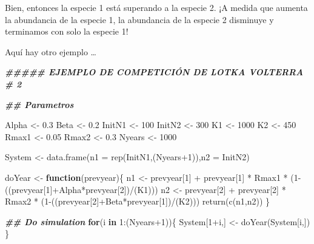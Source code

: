 \documentclass[
]{article}
\newenvironment{Shaded}{\begin{snugshade}}{\end{snugshade}}
\newcommand{\AttributeTok}[1]{\textcolor[rgb]{0.77,0.63,0.00}{#1}}
\newcommand{\ControlFlowTok}[1]{\textcolor[rgb]{0.13,0.29,0.53}{\textbf{#1}}}
\newcommand{\DecValTok}[1]{\textcolor[rgb]{0.00,0.00,0.81}{#1}}
\newcommand{\DocumentationTok}[1]{\textcolor[rgb]{0.56,0.35,0.01}{\textbf{\textit{#1}}}}
\newcommand{\FloatTok}[1]{\textcolor[rgb]{0.00,0.00,0.81}{#1}}
\newcommand{\FunctionTok}[1]{\textcolor[rgb]{0.00,0.00,0.00}{#1}}
\newcommand{\NormalTok}[1]{#1}
\newcommand{\OtherTok}[1]{\textcolor[rgb]{0.56,0.35,0.01}{#1}}
\newcommand{\SpecialCharTok}[1]{\textcolor[rgb]{0.00,0.00,0.00}{#1}}
\begin{document}
Bien, entonces la especie 1 está superando a la especie 2. ¡A medida que
aumenta la abundancia de la especie 1, la abundancia de la especie 2
disminuye y terminamos con solo la especie 1!

Aquí hay otro ejemplo \ldots{}

\begin{Shaded}
\begin{Highlighting}[]
\DocumentationTok{\#\#\#\#\# EJEMPLO DE COMPETICIÓN DE LOTKA VOLTERRA \# 2}

\DocumentationTok{\#\# Parametros}

\NormalTok{Alpha }\OtherTok{\textless{}{-}} \FloatTok{0.3}
\NormalTok{Beta }\OtherTok{\textless{}{-}} \FloatTok{0.2}
\NormalTok{InitN1 }\OtherTok{\textless{}{-}} \DecValTok{100}
\NormalTok{InitN2 }\OtherTok{\textless{}{-}} \DecValTok{300}
\NormalTok{K1 }\OtherTok{\textless{}{-}} \DecValTok{1000}
\NormalTok{K2 }\OtherTok{\textless{}{-}} \DecValTok{450}
\NormalTok{Rmax1 }\OtherTok{\textless{}{-}} \FloatTok{0.05}
\NormalTok{Rmax2 }\OtherTok{\textless{}{-}} \FloatTok{0.3}
\NormalTok{Nyears }\OtherTok{\textless{}{-}} \DecValTok{1000}

\NormalTok{System }\OtherTok{\textless{}{-}} \FunctionTok{data.frame}\NormalTok{(}\AttributeTok{n1 =} \FunctionTok{rep}\NormalTok{(InitN1,(Nyears}\SpecialCharTok{+}\DecValTok{1}\NormalTok{)),}\AttributeTok{n2 =}\NormalTok{ InitN2)}

\NormalTok{doYear }\OtherTok{\textless{}{-}} \ControlFlowTok{function}\NormalTok{(prevyear)\{}
\NormalTok{  n1 }\OtherTok{\textless{}{-}}\NormalTok{ prevyear[}\DecValTok{1}\NormalTok{] }\SpecialCharTok{+}\NormalTok{ prevyear[}\DecValTok{1}\NormalTok{] }\SpecialCharTok{*}\NormalTok{ Rmax1 }\SpecialCharTok{*}\NormalTok{ (}\DecValTok{1}\SpecialCharTok{{-}}\NormalTok{((prevyear[}\DecValTok{1}\NormalTok{]}\SpecialCharTok{+}\NormalTok{Alpha}\SpecialCharTok{*}\NormalTok{prevyear[}\DecValTok{2}\NormalTok{])}\SpecialCharTok{/}\NormalTok{(K1)))}
\NormalTok{  n2 }\OtherTok{\textless{}{-}}\NormalTok{ prevyear[}\DecValTok{2}\NormalTok{] }\SpecialCharTok{+}\NormalTok{ prevyear[}\DecValTok{2}\NormalTok{] }\SpecialCharTok{*}\NormalTok{ Rmax2 }\SpecialCharTok{*}\NormalTok{ (}\DecValTok{1}\SpecialCharTok{{-}}\NormalTok{((prevyear[}\DecValTok{2}\NormalTok{]}\SpecialCharTok{+}\NormalTok{Beta}\SpecialCharTok{*}\NormalTok{prevyear[}\DecValTok{1}\NormalTok{])}\SpecialCharTok{/}\NormalTok{(K2)))}
  \FunctionTok{return}\NormalTok{(}\FunctionTok{c}\NormalTok{(n1,n2))}
\NormalTok{\}}

\DocumentationTok{\#\# Do simulation}
\ControlFlowTok{for}\NormalTok{(i }\ControlFlowTok{in} \DecValTok{1}\SpecialCharTok{:}\NormalTok{(Nyears}\SpecialCharTok{+}\DecValTok{1}\NormalTok{))\{}
\NormalTok{  System[}\DecValTok{1}\SpecialCharTok{+}\NormalTok{i,] }\OtherTok{\textless{}{-}} \FunctionTok{doYear}\NormalTok{(System[i,])}
\NormalTok{\}}
\end{Highlighting}
\end{Shaded}
\end{document}
